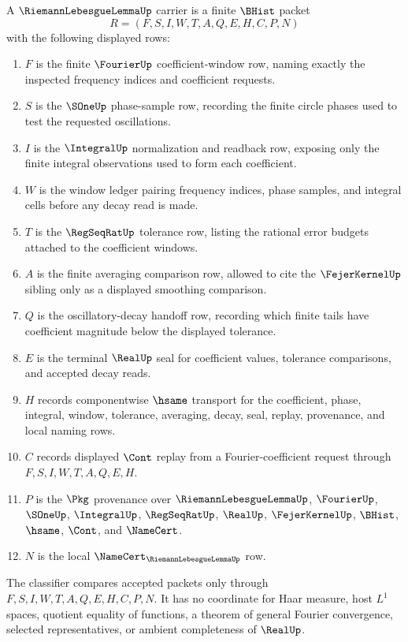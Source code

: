 \begin{definition}
\label{def:riemann-lebesgue-lemma-carrier}
A $\RiemannLebesgueLemmaUp$ carrier is a finite $\BHist$ packet
$$
R=(F,S,I,W,T,A,Q,E,H,C,P,N)
$$
with the following displayed rows:
\begin{enumerate}
\item $F$ is the finite $\FourierUp$ coefficient-window row, naming exactly the inspected frequency indices and coefficient requests.
\item $S$ is the $\SOneUp$ phase-sample row, recording the finite circle phases used to test the requested oscillations.
\item $I$ is the $\IntegralUp$ normalization and readback row, exposing only the finite integral observations used to form each coefficient.
\item $W$ is the window ledger pairing frequency indices, phase samples, and integral cells before any decay read is made.
\item $T$ is the $\RegSeqRatUp$ tolerance row, listing the rational error budgets attached to the coefficient windows.
\item $A$ is the finite averaging comparison row, allowed to cite the $\FejerKernelUp$ sibling only as a displayed smoothing comparison.
\item $Q$ is the oscillatory-decay handoff row, recording which finite tails have coefficient magnitude below the displayed tolerance.
\item $E$ is the terminal $\RealUp$ seal for coefficient values, tolerance comparisons, and accepted decay reads.
\item $H$ records componentwise $\hsame$ transport for the coefficient, phase, integral, window, tolerance, averaging, decay, seal, replay, provenance, and local naming rows.
\item $C$ records displayed $\Cont$ replay from a Fourier-coefficient request through $F,S,I,W,T,A,Q,E,H$.
\item $P$ is the $\Pkg$ provenance over $\RiemannLebesgueLemmaUp$, $\FourierUp$, $\SOneUp$, $\IntegralUp$, $\RegSeqRatUp$, $\RealUp$, $\FejerKernelUp$, $\BHist$, $\hsame$, $\Cont$, and $\NameCert$.
\item $N$ is the local $\NameCert_{\RiemannLebesgueLemmaUp}$ row.
\end{enumerate}
The classifier compares accepted packets only through $F,S,I,W,T,A,Q,E,H,C,P,N$. It has no coordinate for Haar measure, host $L^{1}$ spaces, quotient equality of functions, a theorem of general Fourier convergence, selected representatives, or ambient completeness of $\RealUp$.
\end{definition}

